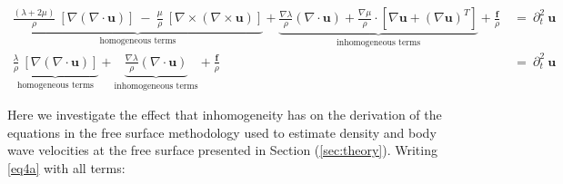 \documentclass[]{article}
\begin{document}
		\begin{subequations}
			\begin{align}
				\underbrace{ \frac{(\lambda + 2\mu)}{\rho} \: [\nabla (\nabla \cdot \bm{u})] \: - \: \frac{\mu}{\rho} \:[\nabla \times (\nabla \times \bm{u})]}_\text{homogeneous terms}  +\underbrace{ \frac{\nabla \lambda}{\rho} (\nabla \cdot \bm{u}) + \frac{\nabla \mu}{\rho} \cdot [\nabla\bm{u}+(\nabla\bm{u})^{T}] }_\text{inhomogeneous terms} +\frac{\bm{f}}{\rho}	\: &= \: \partial_{t}^{2} \: \mathbf{u} 
				\label{eq4a}   \\
				\underbrace{\frac{\lambda}{\rho} \: [\nabla (\nabla \cdot \bm{u})]}_\text{homogeneous terms} +\underbrace{ \frac{\nabla \lambda}{\rho} (\nabla \cdot \bm{u})}_\text{inhomogeneous terms} +\frac{\bm{f}}{\rho} \: &= \: \partial_{t}^{2} \: \mathbf{u}
				\label{eq4b} 
			\end{align} 
		\end{subequations} 

	Here we investigate the effect that inhomogeneity has on the derivation of the equations in the free surface methodology used to estimate density and body wave velocities at the free surface presented in Section (\ref{sec:theory}).   Writing \eqref{eq4a} with all terms:
	
\end{document}
